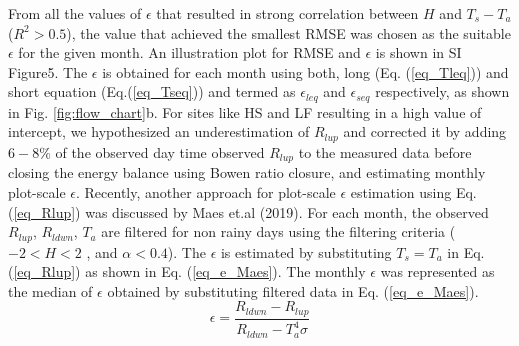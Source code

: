 \documentclass[fleqn,10pt]{wlscirep}
\providecommand{\DIFaddtex}[1]{{\protect\color{blue}\uwave{#1}}} %
\providecommand{\DIFaddbegin}{} %
\providecommand{\DIFaddend}{} %
\providecommand{\DIFadd}[1]{\texorpdfstring{\DIFaddtex{#1}}{#1}} %
\begin{document}
From all the values of $\epsilon$ that resulted in strong correlation between $H$ and $T_{s}-T_{a}$ (\DIFaddbegin \DIFadd{with }\DIFaddend $R^{2}>0.5$), the value that achieved the smallest RMSE was chosen as the suitable $\epsilon$ for the given month. An illustration plot for RMSE and $\epsilon$ is shown in SI Figure5. The $\epsilon$ is obtained for each month using both, long (Eq. (\ref{eq_Tleq})) and short equation (Eq.(\ref{eq_Tseq})) and termed as $\epsilon_{leq}$ and $\epsilon_{seq}$ respectively, as shown in Fig. \ref{fig:flow_chart}b. For sites like HS and LF resulting in a high value of intercept, we hypothesized an underestimation of $R_{lup}$ and corrected it by adding $6-8\%$ of the observed day time observed $R_{lup}$ to the measured data before closing the energy balance using Bowen ratio closure, and estimating monthly plot-scale $\epsilon$. 
Recently, another approach for plot-scale $\epsilon$ estimation using Eq. (\ref{eq_Rlup}) was discussed by Maes et.al (2019)\cite{maes2019potential}. For each month, the observed $R_{lup}$,  $R_{ldwn}$, $T_{a}$  are filtered for non rainy days using the filtering criteria ($-2 < H <2$ , and $\alpha < 0.4$). The $\epsilon$ is estimated by substituting $T_{s} = T_{a}$ in Eq. (\ref{eq_Rlup}) as shown in Eq. (\ref{eq_e_Maes}). The monthly $\epsilon$  was represented as the median of $\epsilon$ obtained by substituting filtered data in Eq. (\ref{eq_e_Maes}). 
\begin{equation}\label{eq_e_Maes}
\epsilon = \frac{R_{ldwn} - R_{lup}}{R_{ldwn} - T_{a}^{4} \sigma}
\end{equation}
\end{document}
